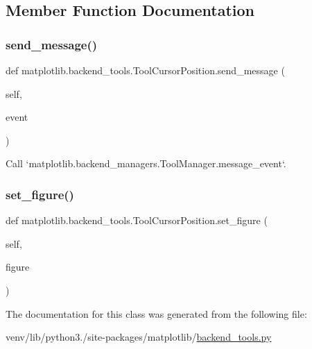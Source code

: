 \subsection{Member Function Documentation}
\mbox{\label{classmatplotlib_1_1backend__tools_1_1ToolCursorPosition_a5c7c58be414505ed62aff0aff1155e7a}} 
\subsubsection{\texorpdfstring{send\+\_\+message()}{send\_message()}}
{\footnotesize\ttfamily def matplotlib.\+backend\+\_\+tools.\+Tool\+Cursor\+Position.\+send\+\_\+message (\begin{DoxyParamCaption}\item[{}]{self,  }\item[{}]{event }\end{DoxyParamCaption})}

\begin{DoxyVerb}Call `matplotlib.backend_managers.ToolManager.message_event`.\end{DoxyVerb}
 \mbox{\label{classmatplotlib_1_1backend__tools_1_1ToolCursorPosition_a6b4f8619f49005745e0b806969268702}} 
\subsubsection{\texorpdfstring{set\+\_\+figure()}{set\_figure()}}
{\footnotesize\ttfamily def matplotlib.\+backend\+\_\+tools.\+Tool\+Cursor\+Position.\+set\+\_\+figure (\begin{DoxyParamCaption}\item[{}]{self,  }\item[{}]{figure }\end{DoxyParamCaption})}



The documentation for this class was generated from the following file\+:\begin{DoxyCompactItemize}
\item 
venv/lib/python3./site-\/packages/matplotlib/\hyperlink{backend__tools_8py}{backend\+\_\+tools.\+py}\end{DoxyCompactItemize}
